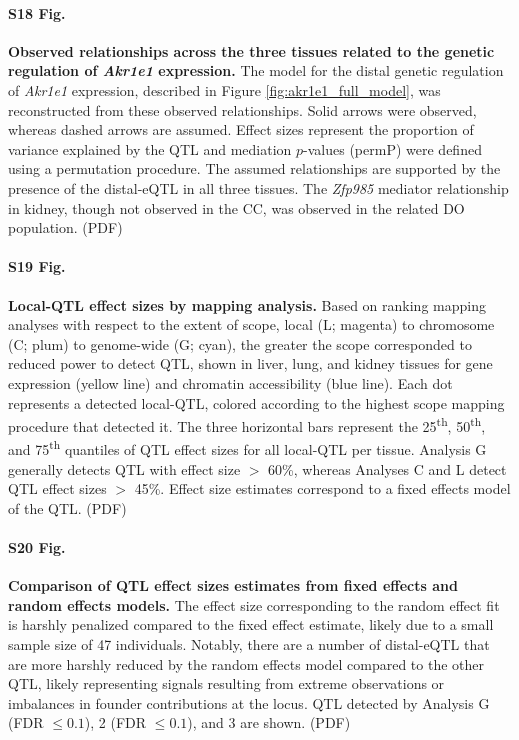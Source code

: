 \documentclass[10pt,letterpaper]{article}
\begin{document}
\paragraph*{S18 Fig.}
\label{S_akr1e1_relationships}
{\bf Observed relationships across the three tissues related to the genetic regulation of \textit{Akr1e1} expression.}
The model for the distal genetic regulation of \textit{Akr1e1} expression, described in Figure \ref{fig:akr1e1_full_model}, was reconstructed from these observed relationships. Solid arrows were observed, whereas dashed arrows are assumed. Effect sizes represent the proportion of variance explained by the QTL and mediation $p$-values (permP) were defined using a permutation procedure. The assumed relationships are supported by the presence of the distal-eQTL in all three tissues. The \textit{Zfp985} mediator relationship in kidney, though not observed in the CC, was observed in the related DO population. (PDF)

\paragraph*{S19 Fig.}
\label{S_qtl_effect_sizes_by_method}
{\bf Local-QTL effect sizes by mapping analysis.}
Based on ranking mapping analyses with respect to the extent of scope, local (L; magenta) to chromosome (C; plum) to genome-wide (G; cyan), the greater the scope corresponded to reduced power to detect QTL, shown in liver, lung, and kidney tissues for gene expression (yellow line) and chromatin accessibility (blue line). Each dot represents a detected local-QTL, colored according to the highest scope mapping procedure that detected it. The three horizontal bars represent the 25\textsuperscript{th}, 50\textsuperscript{th}, and 75\textsuperscript{th} quantiles of QTL effect sizes for all local-QTL per tissue. Analysis G generally detects QTL with effect size $>$ 60\%, whereas Analyses C and L detect QTL effect sizes $>$ 45\%. Effect size estimates correspond to a fixed effects model of the QTL. (PDF)

\paragraph*{S20 Fig.}
\label{S_qtl_effect_size_fixefvsranef}
{\bf Comparison of QTL effect sizes estimates from fixed effects and random effects models.}
The effect size corresponding to the random effect fit is harshly penalized compared to the fixed effect estimate, likely due to a small sample size of 47 individuals. Notably, there are a number of distal-eQTL that are more harshly reduced by the random effects model compared to the other QTL, likely representing signals resulting from extreme observations or imbalances in founder contributions at the locus. QTL detected by Analysis G (FDR $\le 0.1$), 2 (FDR $\le 0.1$), and 3 are shown. (PDF)
\end{document}
